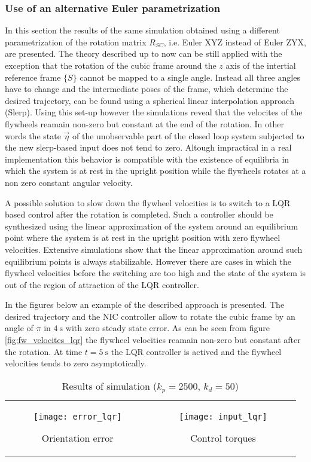 \subsubsection{Use of an alternative Euler parametrization}
In this section the results of the same simulation obtained using a different parametrization of the rotation matrix
$R_{SC}$, i.e. Euler XYZ instead of Euler ZYX, are presented. The theory described up to now
can be still applied with the exception that the rotation of the cubic frame around the $z$ axis
of the intertial reference frame $\{S\}$ cannot be mapped to a single angle. Instead all three angles
have to change and the intermediate poses of the frame, which determine the desired trajectory, can be found 
using a spherical linear interpolation approach (Slerp). Using this set-up however the simulations reveal that
the velocites of the flywheels reamain non-zero but constant at the end of the rotation. In other words
the state $\vec{\eta}$ of the unobservable part of the closed loop system subjected to the new slerp-based input does not
tend to zero. Altough impractical in a real implementation this behavior is compatible with the existence of
equilibria in which the system is at rest in the upright position while the flywheels rotates at a non zero constant angular velocity.
\par
A possible solution to slow down the flywheel velocities is to switch to a LQR based control after the rotation
is completed. Such a controller should be synthesized using the linear approximation of the system around an equilibrium
point where the system is at rest in the upright position with zero flywheel velocities. Extensive simulations show that
the linear approximation around such equilibrium points is always stabilizable. However there are cases in which
the flywheel velocities before the switching are too high and the state of the system is out of the region
of attraction of the LQR controller.
\par
In the figures below an example of the described approach is presented.
The desired trajectory and the NIC controller allow to rotate the cubic frame
by an angle of $\pi$ in $\SI{4}{\second}$ with zero steady state error. As can be
seen from figure \ref{fig:fw_velocites_lqr} the flywheel velocities reamain non-zero
but constant after the rotation. At time $t=\SI{5}{\second}$ the LQR controller is
actived and the flywheel velocities tends to zero asymptotically.
\begin{table}[h]
  \begin{tabular}{cc}
    \begin{subfigure}{0.5\textwidth}
      \centering
      \texttt{[image: error\_lqr]}
      \caption{Orientation error \label{fig:orientation_error_lqr}}
    \end{subfigure}&
    \begin{subfigure}{0.5\textwidth}
      \centering
      \texttt{[image: input\_lqr]}
      \caption{Control torques \label{fig:requested_torques_lqr}}
    \end{subfigure}
  \end{tabular}
  \caption{Results of simulation ($k_p = 2500$, $k_d = 50$)}
\end{table}
